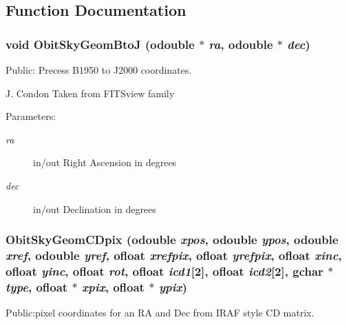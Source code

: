 \subsection{Function Documentation}
\subsubsection{\setlength{\rightskip}{0pt plus 5cm}void Obit\-Sky\-Geom\-Bto\-J ({\bf odouble} $\ast$ {\em ra}, {\bf odouble} $\ast$ {\em dec})}\label{ObitSkyGeom_8h_a19}


Public: Precess B1950 to J2000 coordinates. 

J. Condon Taken from FITSview family \begin{Desc}
\item[Parameters:]
\begin{description}
\item[{\em ra}]in/out Right Ascension in degrees \item[{\em dec}]in/out Declination in degrees \end{description}
\end{Desc}
\subsubsection{ Obit\-Sky\-Geom\-CDpix ({\bf odouble} {\em xpos}, {\bf odouble} {\em ypos}, {\bf odouble} {\em xref}, {\bf odouble} {\em yref}, {\bf ofloat} {\em xrefpix}, {\bf ofloat} {\em yrefpix}, {\bf ofloat} {\em xinc}, {\bf ofloat} {\em yinc}, {\bf ofloat} {\em rot}, {\bf ofloat} {\em icd1}[2], {\bf ofloat} {\em icd2}[2], gchar $\ast$ {\em type}, {\bf ofloat} $\ast$ {\em xpix}, {\bf ofloat} $\ast$ {\em ypix})}\label{ObitSkyGeom_8h_a16}


Public:pixel coordinates for an RA and Dec from IRAF style CD matrix. 


